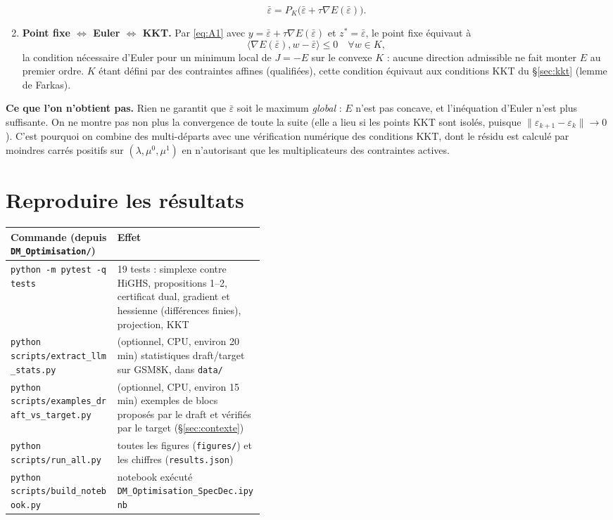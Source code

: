 \documentclass[11pt,a4paper]{article}
\newcommand{\sca}[2]{\langle #1,#2\rangle}
\newcommand{\nr}[1]{\|#1\|}
\theoremstyle{plain}
\theoremstyle{definition}
\begin{document}
\begin{enumerate}
\[\bar\varepsilon=P_K\big(\bar\varepsilon+\tau\nabla E(\bar\varepsilon)\big).\]
\item \textbf{Point fixe $\iff$ Euler $\iff$ KKT.} Par \eqref{eq:A1} avec $y=\bar\varepsilon+\tau\nabla E(\bar\varepsilon)$ et $z^*=\bar\varepsilon$, le point fixe équivaut à
\[\sca{\nabla E(\bar\varepsilon)}{w-\bar\varepsilon}\le0\quad\forall w\in K,\]
la condition nécessaire d'Euler pour un minimum local de $J=-E$ sur le convexe $K$ : aucune direction admissible ne fait monter $E$ au premier ordre. $K$ étant défini par des contraintes affines (qualifiées), cette condition équivaut aux conditions KKT du §\ref{sec:kkt} (lemme de Farkas).
\end{enumerate}
\textbf{Ce que l'on n'obtient pas.} Rien ne garantit que $\bar\varepsilon$ soit le maximum \emph{global} : $E$ n'est pas concave, et l'inéquation d'Euler n'est plus suffisante. On ne montre pas non plus la convergence de toute la suite (elle a lieu si les points KKT sont isolés, puisque $\nr{\varepsilon_{k+1}-\varepsilon_k}\to0$). C'est pourquoi on combine des multi-départs avec une vérification numérique des conditions KKT, dont le résidu est calculé par moindres carrés positifs sur $(\lambda,\mu^0,\mu^1)$ en n'autorisant que les multiplicateurs des contraintes actives.

\section{Reproduire les résultats}
\begin{center}
\small
\begin{tabularx}{\linewidth}{@{}>{\raggedright}p{0.42\linewidth}X@{}}
\toprule
Commande (depuis \texttt{DM\_Optimisation/}) & Effet\\\midrule
\texttt{python -m pytest -q tests} & 19 tests : simplexe contre HiGHS, propositions 1--2, certificat dual, gradient et hessienne (différences finies), projection, KKT\\
\texttt{python scripts/extract\_llm\_stats.py} & (optionnel, CPU, environ 20 min) statistiques draft/target sur GSM8K, dans \texttt{data/}\\
\texttt{python scripts/examples\_draft\_vs\_target.py} & (optionnel, CPU, environ 15 min) exemples de blocs proposés par le draft et vérifiés par le target (§\ref{sec:contexte})\\
\texttt{python scripts/run\_all.py} & toutes les figures (\texttt{figures/}) et les chiffres (\texttt{results.json})\\
\texttt{python scripts/build\_notebook.py} & notebook exécuté \texttt{DM\_Optimisation\_SpecDec.ipynb}\\
\bottomrule
\end{tabularx}
\end{center}
\end{document}

